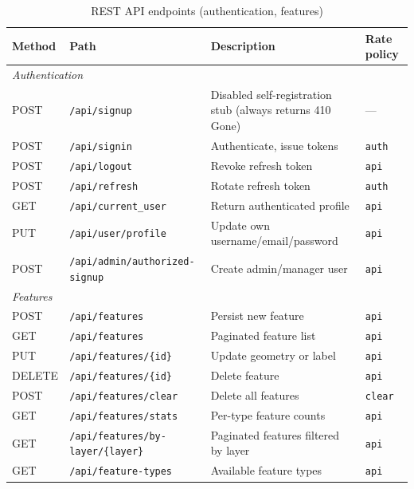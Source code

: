 \documentclass[12pt,a4paper]{article}
\theoremstyle{definition}
\theoremstyle{plain}
\theoremstyle{remark}
\begin{document}
\begin{table}[H]
\centering
\caption{REST API endpoints (authentication, features)}
\label{tab:api_endpoints}
\begin{tabularx}{\textwidth}{ll>{\raggedright\arraybackslash}Xl}
\toprule
\textbf{Method} & \textbf{Path} & \textbf{Description} & \textbf{Rate policy} \\
\midrule
\multicolumn{4}{l}{\textit{Authentication}} \\
POST & \texttt{/api/signup}        & Disabled self-registration stub (always returns 410 Gone) & --- \\
POST & \texttt{/api/signin}        & Authenticate, issue tokens   & \texttt{auth} \\
POST & \texttt{/api/logout}        & Revoke refresh token         & \texttt{api}  \\
POST & \texttt{/api/refresh}       & Rotate refresh token         & \texttt{auth} \\
GET  & \texttt{/api/current\_user} & Return authenticated profile & \texttt{api}  \\
PUT  & \texttt{/api/user/profile}  & Update own username/\allowbreak{}email/\allowbreak{}password & \texttt{api}  \\
POST & \texttt{/api/admin/authorized-signup} & Create admin/manager user & \texttt{api} \\
\midrule
\multicolumn{4}{l}{\textit{Features}} \\
POST   & \texttt{/api/features}            & Persist new feature          & \texttt{api} \\
GET    & \texttt{/api/features}            & Paginated feature list       & \texttt{api} \\
PUT    & \texttt{/api/features/\{id\}}     & Update geometry or label     & \texttt{api} \\
DELETE & \texttt{/api/features/\{id\}}     & Delete feature               & \texttt{api} \\
POST   & \texttt{/api/features/clear}      & Delete all features          & \texttt{clear} \\
GET    & \texttt{/api/features/stats}      & Per-type feature counts      & \texttt{api} \\
GET    & \texttt{/api/features/by-layer/\{layer\}} & Paginated features filtered by layer & \texttt{api} \\
GET    & \texttt{/api/feature-types}       & Available feature types      & \texttt{api} \\
\bottomrule
\end{tabularx}
\end{table}
\end{document}
